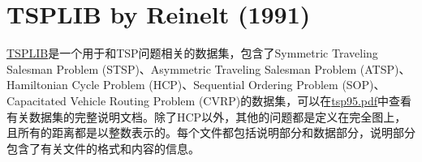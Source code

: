 \section{TSPLIB by Reinelt (1991)}
\href{http://comopt.ifi.uni-heidelberg.de/software/TSPLIB95/}{TSPLIB}是一个用于和TSP问题相关的数据集，包含了Symmetric Traveling Salesman Problem (STSP)、Asymmetric Traveling Salesman Problem (ATSP)、Hamiltonian Cycle Problem (HCP)、Sequential Ordering Problem (SOP)、Capacitated Vehicle Routing Problem (CVRP)的数据集，可以在\href{http://comopt.ifi.uni-heidelberg.de/software/TSPLIB95/tsp95.pdf}{tsp95.pdf}中查看有关数据集的完整说明文档。除了HCP以外，其他的问题都是定义在完全图上，且所有的距离都是以整数表示的。每个文件都包括说明部分和数据部分，说明部分包含了有关文件的格式和内容的信息。



